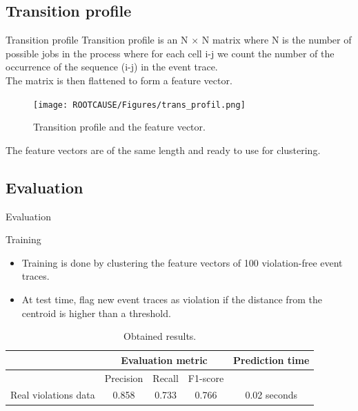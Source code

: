 \documentclass{beamer}
\begin{document}
\subsection{Transition profile}
\begin{frame} %

\begin{block}{Transition profile}
Transition profile is an N $\times$ N matrix where N is the number of possible jobs in the process where for each cell i-j we count the number of the occurrence of the sequence (i-j) in the event trace. \\
The matrix is then flattened to form a feature vector.

\end{block}
\begin{figure}
    \centering
    \texttt{[image: ROOTCAUSE/Figures/trans\_profil.png]}
    \caption{Transition profile and the feature vector.}
    \label{fig:my_label}
\end{figure}

The feature vectors are of the same length and ready to use for clustering. 

\end{frame}

\subsection{Evaluation}
\begin{frame}{Evaluation} %
\begin{block}{Training}
		\begin{itemize}
                \item Training is done by clustering the feature vectors of 100 violation-free event traces.
				\item At test time, flag new event traces as violation if the distance from the centroid is higher than a threshold.
			\end{itemize}
\end{block}
\begin{table}[!h]
\begin{tabular}{ccccc}
\hline
                & \multicolumn{3}{c}{Evaluation metric}& Prediction time \\ \hline
                & Precision    & Recall    & F1-score &  \\ \hline
Real violations data &    0.858&   0.733 &0.766    &0.02 seconds        \\ \hline
\end{tabular}
\caption{Obtained results.}
\end{table}
\end{frame}
\end{document}
